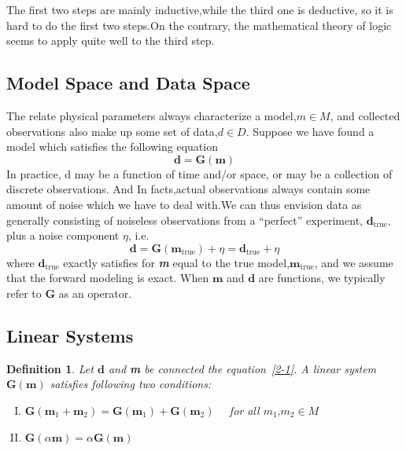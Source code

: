 \documentclass[a4paper]{article}
\newtheorem{definition}[theorem]{Definition}
\newcommand{\tmem}[1]{{\em #1\/}}
\newcommand{\tmmathbf}[1]{\ensuremath{\boldsymbol{#1}}}
\newcommand{\tmop}[1]{\ensuremath{\operatorname{#1}}}
\newcommand{\tmstrong}[1]{\textbf{#1}}
\newenvironment{enumerateromancap}{\begin{enumerate}[I.] }{\end{enumerate}}
\begin{document}
The first two steps are mainly inductive,while the third one is deductive, so
it is hard to do the first two steps.On the contrary, the mathematical theory
of logic seems to apply quite well to the third step.



\subsection{Model Space and Data Space}

The relate physical parameters always characterize a model,{\tmstrong{$m \in
M$}}, and collected observations also make up some set of data,{\tmstrong{$d
\in D$}}. Suppose we have found a model which satisfies the following equation
\begin{equation}
  \tmstrong{d} = \tmstrong{G} \left( \tmmathbf{m} \right) \tmstrong{}
  \label{1-1}
\end{equation}
In practice, d may be a function of time and/or space, or may be a collection
of discrete observations. And In facts,actual observations always contain some
amount of noise which we have to deal with.We can thus envision data as
generally consisting of noiseless observations from a ``perfect'' experiment,
$\tmmathbf{d}_{\tmop{true}}$, plus a noise component $\eta$, i.e.
\begin{equation}
  \tmmathbf{d}=\tmmathbf{G} \left( \tmmathbf{m}_{\tmop{true}} \right) + \eta
  =\tmmathbf{d}_{\tmop{true}} + \eta
  \label{2-1}
\end{equation}
where $\tmmathbf{d}_{\tmop{true}}$ exactly satisfies for
{\tmstrong{{\tmem{{\tmstrong{m}}}}}} equal to the true
model,$\tmmathbf{m}_{\tmop{true}}$, and we assume that the forward modeling is
exact. When $\tmmathbf{m}$ and $\tmmathbf{d}$ are functions, we typically
refer to $\tmmathbf{G}$ as an operator.


\subsection{Linear Systems}

\begin{definition}
  Let $\tmmathbf{d}$ and {\tmstrong{m}} be connected the
  equation~\ref{2-1}.  A linear system $\tmmathbf{G}(\tmmathbf{m})$  satisfies following two
  conditions:
  \begin{enumerateromancap}
    \item $\tmmathbf{G}(\tmmathbf{m}_1 +\tmmathbf{m}_2) =\tmmathbf{G} \left(
    \tmmathbf{m}_1 \right) +\tmmathbf{G} \left( \tmmathbf{m}_2 \right) $ \ \
    for all {\tmstrong{$m_1 \text{,} m_2 \in M$}}

    \item $\tmmathbf{G}(\alpha \tmmathbf{m}) = \alpha
    \tmmathbf{G}(\tmmathbf{m})$
  \end{enumerateromancap}
\end{definition}
\end{document}
